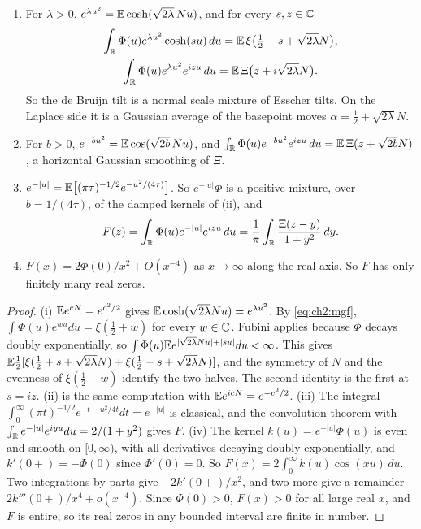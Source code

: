 \begin{proposition}\label{riemanncont:prop:tilts}
\begin{enumerate}
\item[(i)] For $\lambda>0$, $e^{\lambda u^2}=\mathbb{E}\cosh(\sqrt{2\lambda}\,Nu)$, and for every $s,z\in\mathbb{C}$
\[
\begin{gathered}\int_{\mathbb{R}}\Phi(u)e^{\lambda u^2}\cosh(su)\,du=\mathbb{E}\,\xi\big(\tfrac12+s+\sqrt{2\lambda}N\big),\\\int_{\mathbb{R}}\Phi(u)e^{\lambda u^2}e^{izu}\,du=\mathbb{E}\,\Xi\big(z+i\sqrt{2\lambda}N\big).\end{gathered}
\]
So the de Bruijn tilt is a normal scale mixture of Esscher tilts. On the Laplace side it is a Gaussian average of the basepoint moves $\alpha=\frac12+\sqrt{2\lambda}N$.
\item[(ii)] For $b>0$, $e^{-bu^2}=\mathbb{E}\cos(\sqrt{2b}\,Nu)$, and $\int_{\mathbb{R}}\Phi(u)e^{-bu^2}e^{izu}\,du=\mathbb{E}\,\Xi(z+\sqrt{2b}N)$, a horizontal Gaussian smoothing of $\Xi$.
\item[(iii)] $e^{-|u|}=\mathbb{E}\big[(\pi\tau)^{-1/2}e^{-u^2/(4\tau)}\big]$. So $e^{-|u|}\Phi$ is a positive mixture, over $b=1/(4\tau)$, of the damped kernels of (ii), and
\[
F(z)=\int_{\mathbb{R}}\Phi(u)e^{-|u|}e^{izu}\,du=\frac1\pi\int_{\mathbb{R}}\frac{\Xi(z-y)}{1+y^2}\,dy .
\]
\item[(iv)] $F(x)=2\Phi(0)/x^2+O(x^{-4})$ as $x\to\infty$ along the real axis. So $F$ has only finitely many real zeros.
\end{enumerate}
\end{proposition}

\begin{proof}
(i) $\mathbb{E} e^{cN}=e^{c^2/2}$ gives $\mathbb{E}\cosh(\sqrt{2\lambda}Nu)=e^{\lambda u^2}$. By \eqref{eq:ch2:mgf}, $\int\Phi(u)e^{wu}du=\xi(\frac12+w)$ for every $w\in\mathbb{C}$. Fubini applies because $\Phi$ decays doubly exponentially, so $\int\Phi(u)\mathbb{E} e^{|\sqrt{2\lambda}Nu|+|su|}du<\infty$. This gives $\mathbb{E}\frac12[\xi(\frac12+s+\sqrt{2\lambda}N)+\xi(\frac12-s+\sqrt{2\lambda}N)]$, and the symmetry of $N$ and the evenness of $\xi(\frac12+w)$ identify the two halves. The second identity is the first at $s=iz$. (ii) is the same computation with $\mathbb{E} e^{icN}=e^{-c^2/2}$. (iii) The integral $\int_0^\infty(\pi t)^{-1/2}e^{-t-u^2/4t}dt=e^{-|u|}$ is classical, and the convolution theorem with $\int_{\mathbb{R}} e^{-|u|}e^{iyu}du=2/(1+y^2)$ gives $F$. (iv) The kernel $k(u)=e^{-|u|}\Phi(u)$ is even and smooth on $[0,\infty)$, with all derivatives decaying doubly exponentially, and $k'(0+)=-\Phi(0)$ since $\Phi'(0)=0$. So $F(x)=2\int_0^\infty k(u)\cos(xu)\,du$. Two integrations by parts give $-2k'(0+)/x^2$, and two more give a remainder $2k'''(0+)/x^4+o(x^{-4})$. Since $\Phi(0)>0$, $F(x)>0$ for all large real $x$, and $F$ is entire, so its real zeros in any bounded interval are finite in number.
\end{proof}


